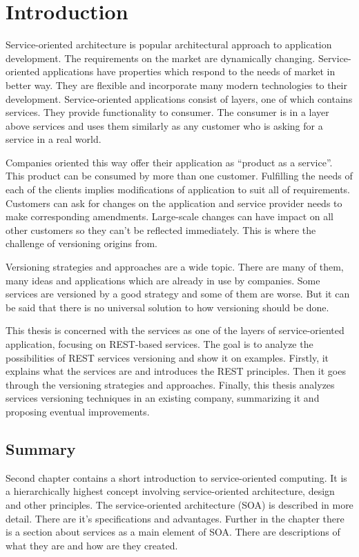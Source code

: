 \chapter{Introduction}
\label{chap:introduction}

Service-oriented architecture is popular architectural approach to application development. The requirements on the market are dynamically changing. Service-oriented applications have properties which respond to the needs of market in better way. They are flexible and incorporate many modern technologies to their development. Service-oriented applications consist of layers, one of which contains services. They provide functionality to consumer. The consumer is in a layer above services and uses them similarly as any customer who is asking for a service in a real world.

Companies oriented this way offer their application as “product as a service”. This product can be consumed by more than one customer. Fulfilling the needs of each of the clients implies modifications of application to suit all of requirements. Customers can ask for changes on the application and service provider needs to make corresponding amendments. Large-scale changes can have impact on all other customers so they can’t be reflected immediately. This is where the challenge of versioning origins from. 

Versioning strategies and approaches are a wide topic. There are many of them, many ideas and applications which are already in use by companies. Some services are versioned by a good strategy and some of them are worse. But it can be said that there is no universal solution to how versioning should be done. 

This thesis is concerned with the services as one of the layers of service-oriented application, focusing on REST-based services. The goal is to analyze the possibilities of REST services versioning and show it on examples. Firstly, it explains what the services are and introduces the REST principles. Then it goes through the versioning strategies and approaches. Finally, this thesis analyzes services versioning techniques in an existing company, summarizing it and proposing eventual improvements.

\section{Summary}

Second chapter contains a short introduction to service-oriented computing. It is a hierarchically highest concept involving service-oriented architecture, design and other principles. The service-oriented architecture (SOA) is described in more detail. There are it’s specifications and advantages. Further in the chapter there is a section about services as a main element of SOA. There are descriptions of what they are and how are they created.

